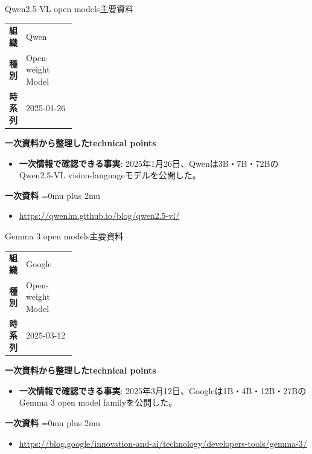 \begin{technicalnote}{Qwen2.5-VL open models}{主要資料}
\begingroup
\begin{tabularx}{\linewidth}{@{}>{\bfseries}p{0.22\linewidth}X@{}}
組織 & Qwen \\
種別 & Open-weight Model \\
時系列 & 2025-01-26 \\
\end{tabularx}
\smallskip
\begin{minipage}{\linewidth}
{\bfseries 一次資料から整理したtechnical points}
\begin{itemize}[leftmargin=1.5em,itemsep=0.35em]
\item \textbf{一次情報で確認できる事実}: 2025年1月26日、Qwenは3B・7B・72BのQwen2.5-VL vision-languageモデルを公開した。
\end{itemize}
\begin{samepage}
{\bfseries 一次資料}
\begingroup\sloppy
\Urlmuskip=0mu plus 2mu\relax
\begin{itemize}[leftmargin=1.5em,itemsep=0.25em]
\item {\scriptsize\url{https://qwenlm.github.io/blog/qwen2.5-vl/}}
\end{itemize}
\endgroup
\end{samepage}
\end{minipage}
\endgroup
\end{technicalnote}
\medskip

\begin{technicalnote}{Gemma 3 open models}{主要資料}
\begingroup
\begin{tabularx}{\linewidth}{@{}>{\bfseries}p{0.22\linewidth}X@{}}
組織 & Google \\
種別 & Open-weight Model \\
時系列 & 2025-03-12 \\
\end{tabularx}
\smallskip
\begin{minipage}{\linewidth}
{\bfseries 一次資料から整理したtechnical points}
\begin{itemize}[leftmargin=1.5em,itemsep=0.35em]
\item \textbf{一次情報で確認できる事実}: 2025年3月12日、Googleは1B・4B・12B・27BのGemma 3 open model familyを公開した。
\end{itemize}
\begin{samepage}
{\bfseries 一次資料}
\begingroup\sloppy
\Urlmuskip=0mu plus 2mu\relax
\begin{itemize}[leftmargin=1.5em,itemsep=0.25em]
\item {\scriptsize\url{https://blog.google/innovation-and-ai/technology/developers-tools/gemma-3/}}
\end{itemize}
\endgroup
\end{samepage}
\end{minipage}
\endgroup
\end{technicalnote}
\medskip

